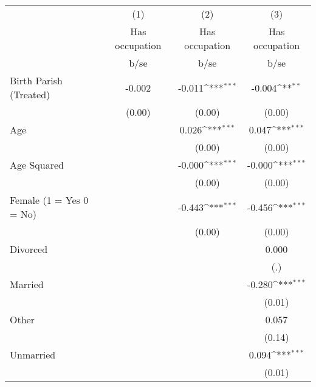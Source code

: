 {
\def\sym#1{\ifmmode^{#1}\else\(^{#1}\)\fi}
\begin{tabular}{l*{3}{c}}
\hline\hline
                    &\multicolumn{1}{c}{(1)}&\multicolumn{1}{c}{(2)}&\multicolumn{1}{c}{(3)}\\
                    &\multicolumn{1}{c}{Has occupation}&\multicolumn{1}{c}{Has occupation}&\multicolumn{1}{c}{Has occupation}\\
                    &        b/se         &        b/se         &        b/se         \\
\hline
Birth Parish (Treated)&      -0.002         &      -0.011\sym{***}&      -0.004\sym{**} \\
                    &      (0.00)         &      (0.00)         &      (0.00)         \\
Age                 &                     &       0.026\sym{***}&       0.047\sym{***}\\
                    &                     &      (0.00)         &      (0.00)         \\
Age Squared         &                     &      -0.000\sym{***}&      -0.000\sym{***}\\
                    &                     &      (0.00)         &      (0.00)         \\
Female (1 = Yes 0 = No)&                     &      -0.443\sym{***}&      -0.456\sym{***}\\
                    &                     &      (0.00)         &      (0.00)         \\
Divorced            &                     &                     &       0.000         \\
                    &                     &                     &         (.)         \\
Married             &                     &                     &      -0.280\sym{***}\\
                    &                     &                     &      (0.01)         \\
Other               &                     &                     &       0.057         \\
                    &                     &                     &      (0.14)         \\
Unmarried           &                     &                     &       0.094\sym{***}\\
                    &                     &                     &      (0.01)         \\

\end{tabular}}
